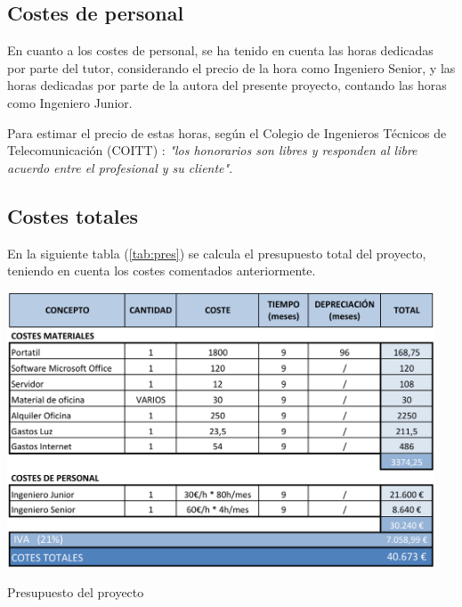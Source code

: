 \subsection{Costes de personal}
En cuanto a los costes de personal, se ha tenido en cuenta las horas dedicadas por parte del tutor, considerando el precio de la hora como Ingeniero Senior, y las horas dedicadas por parte de la autora del presente proyecto, contando las horas como Ingeniero Junior. 

Para estimar el precio de estas horas, según el Colegio de Ingenieros Técnicos de Telecomunicación (COITT) \cite{6}: \textit{"los honorarios son libres y responden al libre acuerdo entre el profesional y su cliente"}. 
\subsection{Costes totales}
En la siguiente tabla (\ref{tab:pres}) se calcula el presupuesto total del proyecto, teniendo en cuenta los costes comentados anteriormente. 
\begin{table}[H]
	\centering
	\includegraphics[width=5in]{PDF/Presupuesto.pdf}
	\caption{Presupuesto del proyecto}
	\label{tab:pres}
\end{table}
